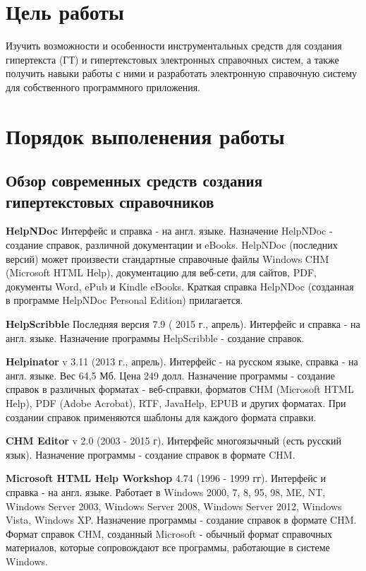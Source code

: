 	\section{Цель работы}
		Изучить возможности и особенности инструментальных средств для создания гипертекста (ГТ) и гипертекстовых электронных справочных систем, а также получить навыки работы с ними и разработать электронную справочную систему для собственного программного приложения. 
	\section{Порядок выполенения работы}
	
		\subsection{Обзор современных средств создания гипертекстовых справочников}
		
		\textbf{HelpNDoc} Интерфейс и справка - на англ. языке.
		Назначение HelpNDoc - создание справок, различной документации и eBooks. HelpNDoc (последних версий) может произвести стандартные справочные файлы Windows CHM (Microsoft HTML Help), документацию для веб-сети, для сайтов, PDF, документы Word, ePub и Kindle eBooks.
		Краткая справка HelpNDoc (созданная в программе HelpNDoc Personal Edition) прилагается.
		
		
		\textbf{HelpScribble} Последняя версия 7.9 ( 2015 г., апрель). Интерфейс и справка - на англ. языке.
		Назначение программы HelpScribble - создание справок. 
		
		\textbf{Helpinator} v 3.11 (2013 г., апрель). Интерфейс - на русском языке, справка - на англ. языке. Вес  64,5 Мб. Цена 249 долл.
		Назначение программы - создание справок в различных форматах - веб-справки, форматов CHM (Microsoft HTML Help), PDF (Adobe Acrobat), RTF, JavaHelp, EPUB и других форматах.
		При создании справок применяются шаблоны для каждого формата справки.
		
		\textbf{CHM Editor} v 2.0 (2003 - 2015 г). Интерфейс многоязычный (есть русский язык). 
		Назначение программы - создание справок в формате CHM.
		
		\textbf{Microsoft HTML Help Workshop} 4.74 (1996 - 1999 гг). Интерфейс и справка - на англ. языке. Работает в Windows 2000,  7, 8, 95,  98,  ME,  NT, Windows Server 2003, Windows Server 2008, Windows Server 2012, Windows Vista, Windows XP.
		Назначение программы - создание справок в формате CHM.
		Формат справок CHM, созданный  Microsoft - обычный формат справочных материалов, которые сопровождают все программы, работающие в системе Windows.
		
